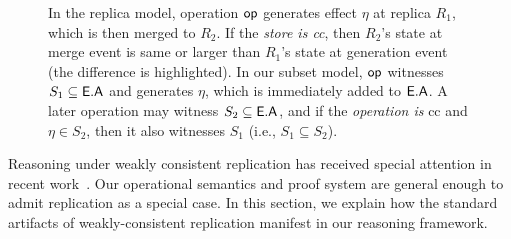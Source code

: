 \begin{figure}
{}
\hspace*{0.1in}
 \caption{In the replica model, operation $\textsf{op}$ generates effect
$\eta$ at replica $R_1$, which is then merged to $R_2$. If the
\emph{store is {\sc cc}}, then $R_2$'s state at merge event is same or
larger than $R_1$'s state at generation event (the difference is
highlighted). In our subset model, $\textsf{op}$ witnesses $S_1 \subseteq
\textsf{E}.\textsf{A}$ and generates $\eta$, which is immediately added to $\textsf{E}.\textsf{A}$. A
later operation may witness $S_2 \subseteq \textsf{E}.\textsf{A}$, and if the
\emph{operation is} {\sc cc} and $\eta \in S_2$, then it also
witnesses $S_1$ (i.e., $S_1 \subseteq S_2$). } 
\label{fig:ec-theirs-vs-ours}
\end{figure}

Reasoning under weakly consistent replication has received special
attention in recent work~\cite{gotsmanpopl16}. Our operational
semantics and proof system are general enough to admit replication as
a special case. In this section, we explain how the standard artifacts
of weakly-consistent replication manifest in our reasoning framework.


